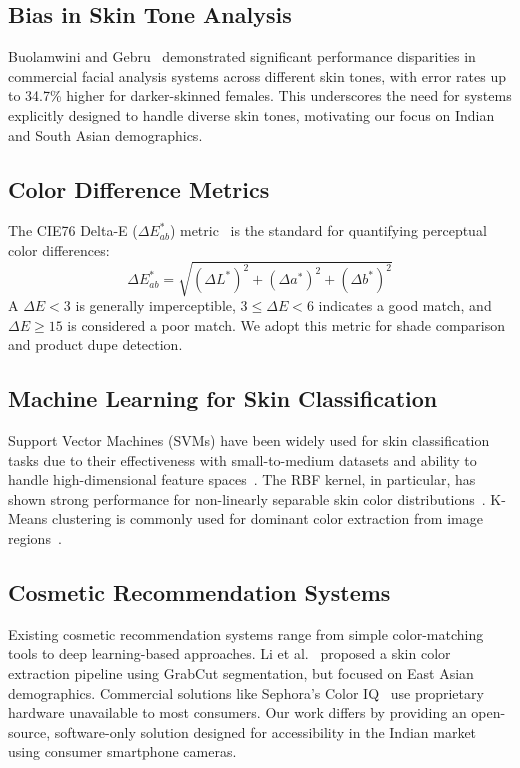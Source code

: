 \documentclass[conference]{IEEEtran}
\begin{document}
\subsection{Bias in Skin Tone Analysis}

Buolamwini and Gebru~\cite{buolamwini2018} demonstrated significant performance disparities in commercial facial analysis systems across different skin tones, with error rates up to 34.7\% higher for darker-skinned females. This underscores the need for systems explicitly designed to handle diverse skin tones, motivating our focus on Indian and South Asian demographics.

\subsection{Color Difference Metrics}

The CIE76 Delta-E ($\Delta E^*_{ab}$) metric~\cite{cie1976} is the standard for quantifying perceptual color differences:
\begin{equation}
\Delta E^*_{ab} = \sqrt{(\Delta L^*)^2 + (\Delta a^*)^2 + (\Delta b^*)^2}
\label{eq:delta_e}
\end{equation}
A $\Delta E < 3$ is generally imperceptible, $3 \leq \Delta E < 6$ indicates a good match, and $\Delta E \geq 15$ is considered a poor match. We adopt this metric for shade comparison and product dupe detection.

\subsection{Machine Learning for Skin Classification}

Support Vector Machines (SVMs) have been widely used for skin classification tasks due to their effectiveness with small-to-medium datasets and ability to handle high-dimensional feature spaces~\cite{cortes1995}. The RBF kernel, in particular, has shown strong performance for non-linearly separable skin color distributions~\cite{khan2012}. K-Means clustering is commonly used for dominant color extraction from image regions~\cite{lloyd1982}.

\subsection{Cosmetic Recommendation Systems}

Existing cosmetic recommendation systems range from simple color-matching tools to deep learning-based approaches. Li et al.~\cite{li2019} proposed a skin color extraction pipeline using GrabCut segmentation, but focused on East Asian demographics. Commercial solutions like Sephora's Color IQ~\cite{sephora2012} use proprietary hardware unavailable to most consumers. Our work differs by providing an open-source, software-only solution designed for accessibility in the Indian market using consumer smartphone cameras.
\end{document}

